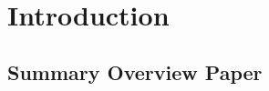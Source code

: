 \documentclass[12pt]%
{article}
\begin{document}
\newpage\thispagestyle{empty}~ %
\newpage 

\begin{abstract}
\end{abstract}

\newpage

\tableofcontents

\newpage

\section{Introduction}

\subsection{Summary Overview Paper}
\end{document}
